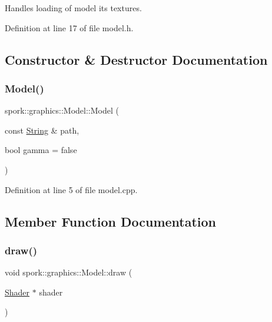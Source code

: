 Handles loading of model its textures. 

Definition at line 17 of file model.\+h.



\subsection{Constructor \& Destructor Documentation}
\mbox{\label{classspork_1_1graphics_1_1_model_a774761cdfe1a21c1eb9223fc4adf7261}} 
\subsubsection{\texorpdfstring{Model()}{Model()}}
{\footnotesize\ttfamily spork\+::graphics\+::\+Model\+::\+Model (\begin{DoxyParamCaption}\item[{const \hyperlink{my_string_8h_afbeda3fd1bdc8c37d01bdf9f5c8274ff}{String} \&}]{path,  }\item[{bool}]{gamma = {\ttfamily false} }\end{DoxyParamCaption})}



Definition at line 5 of file model.\+cpp.



\subsection{Member Function Documentation}
\mbox{\label{classspork_1_1graphics_1_1_model_a35ded645db58e34f4404c7fa280767d0}} 
\subsubsection{\texorpdfstring{draw()}{draw()}}
{\footnotesize\ttfamily void spork\+::graphics\+::\+Model\+::draw (\begin{DoxyParamCaption}\item[{\hyperlink{classspork_1_1graphics_1_1_shader}{Shader} $\ast$}]{shader }\end{DoxyParamCaption})}



